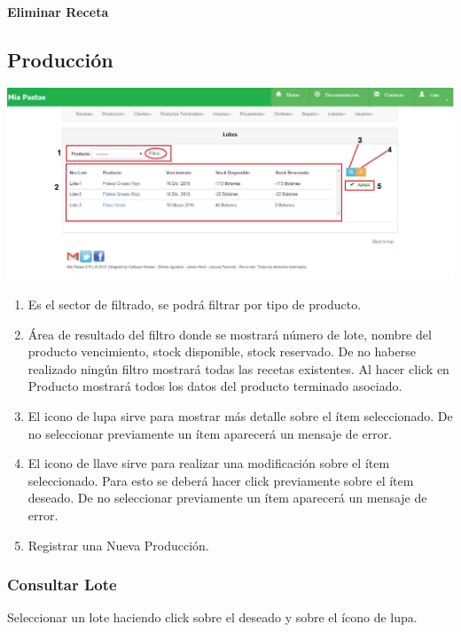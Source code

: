 \documentclass[letterpaper,10pt,english]{sphinxmanual}
\begin{document}
\paragraph{{}Eliminar Receta}
\label{receta eliminar::doc}\label{receta eliminar:eliminar-receta}

\subsection{{}Producción}
\label{lotes:produccion}\label{lotes::doc}
\includegraphics{lotes_ini.jpg}
\begin{enumerate}
\item {} 
Es el sector de filtrado, se podrá filtrar por tipo de producto.

\item {} 
Área de resultado del filtro donde se mostrará número de lote, nombre del producto vencimiento, stock disponible, stock reservado. De no haberse realizado ningún filtro mostrará todas las recetas existentes. Al hacer click en Producto mostrará todos los datos del producto terminado asociado.

\item {} 
El icono de lupa sirve para mostrar más detalle sobre el ítem seleccionado. De no seleccionar previamente un ítem aparecerá un mensaje de error.

\item {} 
El icono de llave sirve para realizar una modificación sobre el ítem seleccionado. Para esto se deberá hacer click previamente sobre el ítem deseado. De no seleccionar previamente un ítem aparecerá un mensaje de error.

\item {} 
Registrar una Nueva Producción.

\end{enumerate}


\subsubsection{Consultar Lote}
\label{lotes:consultar-lote}
Seleccionar un lote haciendo click sobre el deseado y sobre el ícono de lupa.
\end{document}
